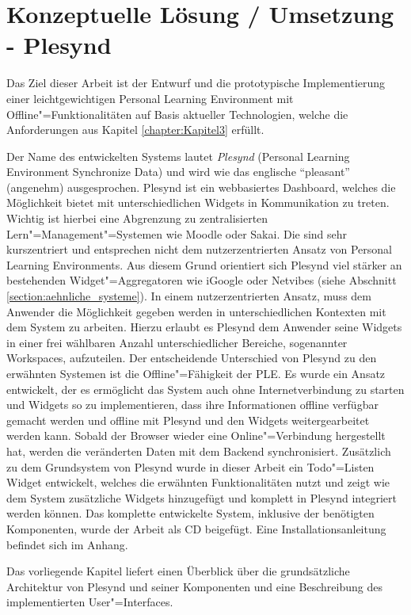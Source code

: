 \chapter{Konzeptuelle Lösung / Umsetzung - Plesynd} 
\label{chapter:Kapitel5}
Das Ziel dieser Arbeit ist der Entwurf und die prototypische Implementierung einer leichtgewichtigen Personal Learning Environment mit Offline"=Funktionalitäten auf Basis aktueller Technologien, welche die Anforderungen aus Kapitel \ref{chapter:Kapitel3} erfüllt. 

Der Name des entwickelten Systems lautet \emph{Plesynd} (Personal Learning Environment Synchronize Data) und wird wie das englische "`pleasant"' (angenehm) ausgesprochen. Plesynd ist ein webbasiertes Dashboard, welches die Möglichkeit bietet mit unterschiedlichen Widgets in Kommunikation zu treten. Wichtig ist hierbei eine Abgrenzung zu zentralisierten Lern"=Management"=Systemen wie Moodle oder Sakai. Die sind sehr kurszentriert und entsprechen nicht dem nutzerzentrierten Ansatz von Personal Learning Environments. Aus diesem Grund orientiert sich Plesynd viel stärker an bestehenden Widget"=Aggregatoren wie iGoogle oder Netvibes (siehe Abschnitt \ref{section:aehnliche_systeme}). In einem nutzerzentrierten Ansatz, muss dem Anwender die Möglichkeit gegeben werden in unterschiedlichen Kontexten mit dem System zu arbeiten. Hierzu erlaubt es Plesynd dem Anwender seine Widgets in einer frei wählbaren Anzahl unterschiedlicher Bereiche, sogenannter Workspaces, aufzuteilen. Der entscheidende Unterschied von Plesynd zu den erwähnten Systemen ist die Offline"=Fähigkeit der PLE. Es wurde ein Ansatz entwickelt, der es ermöglicht das System auch ohne Internetverbindung zu starten und Widgets so zu implementieren, dass ihre Informationen offline verfügbar gemacht werden und offline mit Plesynd und den Widgets weitergearbeitet werden kann. Sobald der Browser wieder eine Online"=Verbindung hergestellt hat, werden die veränderten Daten mit dem Backend synchronisiert. Zusätzlich zu dem Grundsystem von Plesynd wurde in dieser Arbeit ein Todo"=Listen Widget entwickelt, welches die erwähnten Funktionalitäten nutzt und zeigt wie dem System zusätzliche Widgets hinzugefügt und komplett in Plesynd integriert werden können. Das komplette entwickelte System, inklusive der benötigten Komponenten, wurde der Arbeit als CD beigefügt. Eine Installationsanleitung befindet sich im Anhang.

Das vorliegende Kapitel liefert einen Überblick über die grundsätzliche Architektur von Plesynd und seiner Komponenten und eine Beschreibung des implementierten User"=Interfaces.

